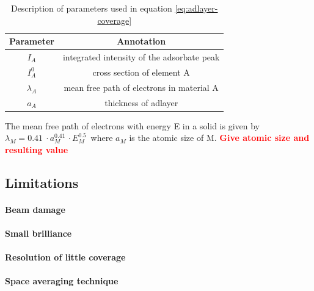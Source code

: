 	\begin{table}[h!]\centering
		\caption{Description of parameters used in equation
			\ref{eq:adlayer-coverage}}
		\label{tab:adlayer-coverage-parameters}
		\begin{tabular}{cc}
			Parameter & Annotation \\ \hline
			$I_A$	& integrated intensity of the adsorbate peak \\
			$I_A^0$ & cross section of element A \\
			$\lambda_A$ & mean free path of electrons in material A \\
			$a_A$ & thickness of adlayer \\
		\end{tabular}
	\end{table}
	
	The mean free path of electrons with energy E in a solid is given by $\lambda_M=\SI{0,41}{}\cdot a_M^{\SI{0,41}{}}\cdot E_M^{\SI{0,5}{}} $ where $a_M$ is the atomic size of M. 
	\textcolor{red}{\textbf{Give atomic size and resulting value}}
	
\subsection{Limitations}
	\paragraph{Beam damage}
	\paragraph{Small brilliance}
	\paragraph{Resolution of little coverage}
	\paragraph{Space averaging technique}